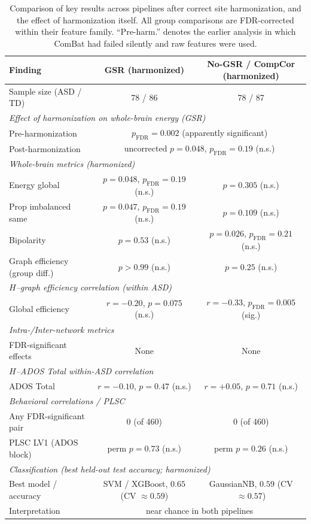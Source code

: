 \documentclass[10pt,letterpaper]{article}
\begin{document}
\begin{table}[ht]
\centering
\caption{Comparison of key results across pipelines after correct site harmonization, and the
effect of harmonization itself. All group comparisons are FDR-corrected within their feature family.
``Pre-harm.'' denotes the earlier analysis in which ComBat had failed silently and raw features were
used.}
\label{tab:GSR_comparison}
\small
\begin{tabular}{lcc}
\toprule
\textbf{Finding} & \textbf{GSR (harmonized)} & \textbf{No-GSR / CompCor (harmonized)} \\
\midrule
Sample size (ASD / TD) & 78 / 86 & 78 / 87 \\
\midrule
\multicolumn{3}{l}{\textit{Effect of harmonization on whole-brain energy (GSR)}} \\
\quad Pre-harmonization & \multicolumn{2}{c}{$p_{\mathrm{FDR}} = 0.002$ (apparently significant)} \\
\quad Post-harmonization & \multicolumn{2}{c}{uncorrected $p = 0.048$, $p_{\mathrm{FDR}} = 0.19$ (n.s.)} \\
\midrule
\multicolumn{3}{l}{\textit{Whole-brain metrics (harmonized)}} \\
\quad Energy global & $p = 0.048$, $p_{\mathrm{FDR}} = 0.19$ (n.s.) & $p = 0.305$ (n.s.) \\
\quad Prop imbalanced same & $p = 0.047$, $p_{\mathrm{FDR}} = 0.19$ (n.s.) & $p = 0.109$ (n.s.) \\
\quad Bipolarity & $p = 0.53$ (n.s.) & $p = 0.026$, $p_{\mathrm{FDR}} = 0.21$ (n.s.) \\
\quad Graph efficiency (group diff.) & $p > 0.99$ (n.s.) & $p = 0.25$ (n.s.) \\
\midrule
\multicolumn{3}{l}{\textit{$H$--graph efficiency correlation (within ASD)}} \\
\quad Global efficiency & $r = -0.20$, $p = 0.075$ (n.s.) & $r = -0.33$, $p_{\mathrm{FDR}} = 0.005$ (sig.) \\
\midrule
\multicolumn{3}{l}{\textit{Intra-/Inter-network metrics}} \\
\quad FDR-significant effects & None & None \\
\midrule
\multicolumn{3}{l}{\textit{$H$--ADOS Total within-ASD correlation}} \\
\quad ADOS Total & $r = -0.10$, $p = 0.47$ (n.s.) & $r = +0.05$, $p = 0.71$ (n.s.) \\
\midrule
\multicolumn{3}{l}{\textit{Behavioral correlations / PLSC}} \\
\quad Any FDR-significant pair & 0 (of 460) & 0 (of 460) \\
\quad PLSC LV1 (ADOS block) & perm $p = 0.73$ (n.s.) & perm $p = 0.26$ (n.s.) \\
\midrule
\multicolumn{3}{l}{\textit{Classification (best held-out test accuracy; harmonized)}} \\
\quad Best model / accuracy & SVM / XGBoost, $0.65$ (CV $\approx 0.59$) & GaussianNB, $0.59$ (CV $\approx 0.57$) \\
\quad Interpretation & \multicolumn{2}{c}{near chance in both pipelines} \\
\bottomrule
\end{tabular}
\end{table}
\end{document}
